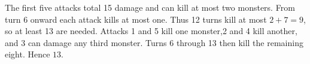 The first five attacks total 15 damage and can kill at most two monsters. From turn 6 onward each attack kills at most one. Thus 12 turns kill at most $2+7=9$, so at least 13 are needed. Attacks 1 and 5 kill one monster,2 and 4 kill another, and 3 can damage any third monster. Turns 6 through 13 then kill the remaining eight. Hence $\boxed{13}$.
